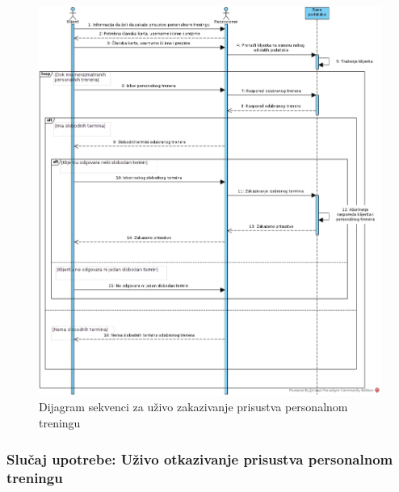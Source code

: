 \newpage
\begin{figure}[!ht]
\begin{center}
\includegraphics[scale=0.40]{sections/images/dijagram_sekvenci_personalni_uzivo_zakazivanje_prisustva.jpg}
\end{center}
\caption{Dijagram sekvenci za uživo zakazivanje prisustva personalnom treningu}
\label{fig:kontekst}
\end{figure}

    
   



\subsubsection{Slučaj upotrebe: Uživo otkazivanje prisustva personalnom treningu}

